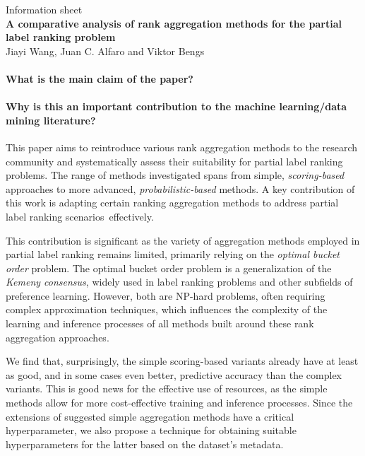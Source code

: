 \documentclass[pdflatex, sn-apa]{sn-jnl}
\begin{document}
%
\thispagestyle{empty}
\begin{center}
	{
        \large
        Information sheet
    }%
    \\ \medskip%
	{
        \LARGE
        \textbf{A comparative analysis of rank aggregation methods for the partial label ranking problem}
    }%
    \\ \medskip%
	Jiayi Wang, Juan C. Alfaro and Viktor Bengs
	 
\end{center}

\paragraph{What is the main claim of the paper?}
\paragraph{Why is this an important contribution to the machine learning/data mining literature?} 
%
%
This paper aims to reintroduce various rank aggregation methods to the research community and systematically assess their suitability for partial label ranking problems.
%
The range of methods investigated spans from simple, \textit{scoring-based} approaches to more advanced, \textit{probabilistic-based} methods.
%
A key contribution of this work is adapting certain ranking aggregation methods to address partial label ranking scenarios~effectively.
%
%

This contribution is significant as the  variety of aggregation methods employed in partial label ranking remains limited, primarily relying on the \textit{optimal bucket order} problem.
%
The optimal bucket order problem is a generalization of the \textit{Kemeny consensus}, widely used in label ranking problems and other subfields of preference learning. 
%
However, both are NP-hard problems, often requiring complex approximation techniques, which influences the complexity of the learning and inference processes of all methods built around these rank aggregation approaches.
%
%

We find that, surprisingly, the simple scoring-based variants already have at least as good, and in some cases even better, predictive accuracy than the complex variants.
%
This is good news for the effective use of resources, as the simple methods allow for more cost-effective training and inference processes. 
%
Since the extensions of suggested simple aggregation methods have a critical hyperparameter, we also propose a technique for obtaining suitable hyperparameters for the latter based on the dataset's metadata.
%
%
\end{document}
